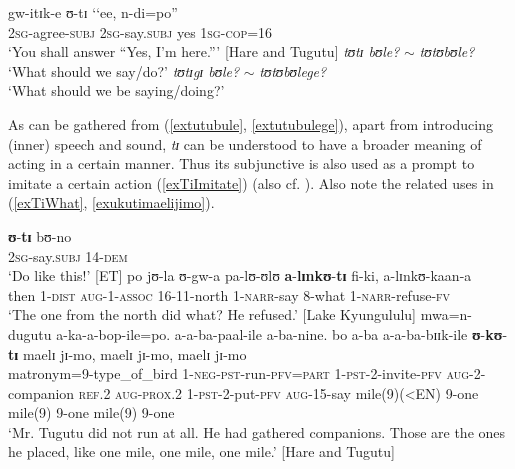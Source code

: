 \begin{exe}
\ex \label{extiSubjunctive}\gll gw-itɪk-e ʊ-tɪ \textup{\lq\lq}ee, n-di=po\textup{''}\\
\textsc{2sg}-agree-\textsc{subj} \textsc{2sg}-say.\textsc{subj} \phantom{\lq\lq}yes \textsc{1sg}-\textsc{cop}=16\\
\glt \lq You shall answer ``Yes, I'm here.''{}' [Hare and Tugutu] %
\ex \label{extutubule}\textit{tʊtɪ bʊle?} $\sim$ \textit{tʊtʊbʊle?}
\\ \lq What should we say/do?'
\ex \label{extutubulege}\textit{tʊtɪgɪ bʊle?} $\sim$ \textit{tʊtʊbʊlege?}
\\ \lq What should we be saying/doing?'
\end{exe}

As can be gathered from (\ref{extutubule}, \ref{extutubulege}), apart from introducing (inner) speech and sound, \textit{tɪ} can be understood to have a broader meaning of acting in a certain manner. Thus its subjunctive is also used as a prompt to imitate a certain action (\ref{exTiImitate}) (also cf. \citealt[97]{FelbergK1996}). Also note the related uses in (\ref{exTiWhat}, \ref{exukutimaelijimo}).
\begin{exe}
\ex \label{exTiImitate}
\gll \textbf{ʊ}-\textbf{tɪ} bʊ-no\\
\textsc{2sg}-say.\textsc{subj} 14-\textsc{dem}\\
\glt `Do like this!' [ET]
\ex \label{exTiWhat} \gll po jʊ-la ʊ-gw-a pa-lʊ-ʊlʊ \textbf{a}-\textbf{lɪnkʊ}-\textbf{tɪ} fi-ki, a-lɪnkʊ-kaan-a\\
then 1-\textsc{dist} \textsc{aug}-1-\textsc{assoc} 16-11-north 1-\textsc{narr}-say 8-what 1-\textsc{narr}-refuse-\textsc{fv}\\
\glt \lq The one from the north did what? He refused.' [Lake Kyungululu]
\ex \label{exukutimaelijimo}
\gll mwa=n-dugutu a-ka-a-bop-ile=po. a-a-ba-paal-ile a-ba-nine. bo a-ba a-a-ba-bɪɪk-ile \textbf{ʊ}-\textbf{kʊ}-\textbf{tɪ} maelɪ jɪ-mo, maelɪ jɪ-mo, maelɪ jɪ-mo\\
matronym=9-type\_of\_bird 1-\textsc{neg}-\textsc{pst}-run-\textsc{pfv}=\textsc{part} 1-\textsc{pst}-2-invite-\textsc{pfv} \textsc{aug}-2-companion \textsc{ref.2} \textsc{aug}-\textsc{prox.2} 1-\textsc{pst}-2-put-\textsc{pfv} \textsc{aug}-15-say mile(9)(<EN) 9-one mile(9) 9-one mile(9) 9-one\\
\glt `Mr. Tugutu did not run at all. He had gathered companions. Those are the ones he placed, like one mile, one mile, one mile.' [Hare and Tugutu]
\end{exe}

